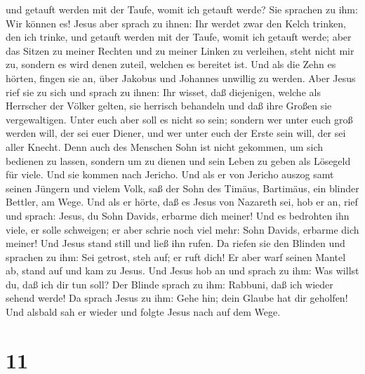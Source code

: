 und getauft werden mit der Taufe, womit ich getauft werde?
 Sie sprachen zu ihm: Wir können es! Jesus aber sprach zu
ihnen: Ihr werdet zwar den Kelch trinken, den ich trinke, und getauft
werden mit der Taufe, womit ich getauft werde;  aber das
Sitzen zu meiner Rechten und zu meiner Linken zu verleihen, steht nicht
mir zu, sondern es wird denen zuteil, welchen es bereitet ist.
 Und als die Zehn es hörten, fingen sie an, über Jakobus
und Johannes unwillig zu werden.  Aber Jesus rief sie zu
sich und sprach zu ihnen: Ihr wisset, daß diejenigen, welche als
Herrscher der Völker gelten, sie herrisch behandeln und daß ihre Großen
sie vergewaltigen.  Unter euch aber soll es nicht so
sein; sondern wer unter euch groß werden will, der sei euer Diener,
 und wer unter euch der Erste sein will, der sei aller
Knecht.  Denn auch des Menschen Sohn ist nicht gekommen,
um sich bedienen zu lassen, sondern um zu dienen und sein Leben zu geben
als Lösegeld für viele.  Und sie kommen nach Jericho. Und
als er von Jericho auszog samt seinen Jüngern und vielem Volk, saß der
Sohn des Timäus, Bartimäus, ein blinder Bettler, am Wege.
 Und als er hörte, daß es Jesus von Nazareth sei, hob er
an, rief und sprach: Jesus, du Sohn Davids, erbarme dich meiner!
 Und es bedrohten ihn viele, er solle schweigen; er aber
schrie noch viel mehr: Sohn Davids, erbarme dich meiner! 
Und Jesus stand still und ließ ihn rufen. Da riefen sie den Blinden und
sprachen zu ihm: Sei getrost, steh auf; er ruft dich!  Er
aber warf seinen Mantel ab, stand auf und kam zu Jesus. 
Und Jesus hob an und sprach zu ihm: Was willst du, daß ich dir tun soll?
Der Blinde sprach zu ihm: Rabbuni, daß ich wieder sehend werde!
 Da sprach Jesus zu ihm: Gehe hin; dein Glaube hat dir
geholfen! Und alsbald sah er wieder und folgte Jesus nach auf dem Wege.

\hypertarget{section-10}{%
\section{11}\label{section-10}}

